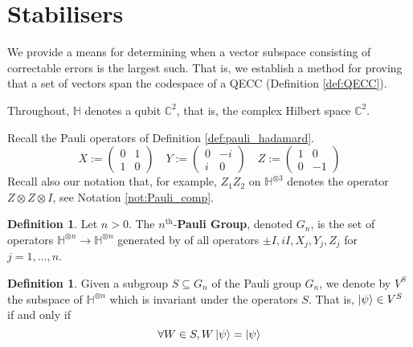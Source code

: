 \documentclass[12pt]{article}
\theoremstyle{plain}
\theoremstyle{definition}
\newtheorem{defn}[thm]{Definition} %
\newcommand{\bb}[1]{\mathbb{#1}}
\newcommand{\lto}{\longrightarrow}
\begin{document}
\section{Stabilisers}\label{sec:stabilisers}
	We provide a means for determining when a vector subspace consisting of correctable errors is the largest such. That is, we establish a method for proving that a set of vectors span the codespace of a QECC (Definition \ref{def:QECC}).
	
	Throughout, $\bb{H}$ denotes a qubit $\bb{C}^2$, that is, the complex Hilbert space $\bb{C}^2$.
	
	Recall the Pauli operators of Definition \ref{def:pauli_hadamard}.
	\begin{equation}
		X :=
		\begin{pmatrix}
			0 &1\\
			1 &0
		\end{pmatrix}
		\quad
		Y :=
		\begin{pmatrix}
			0 & -i\\
			i & 0
		\end{pmatrix}
	\quad
		Z :=
		\begin{pmatrix}
			1 & 0\\
			0 & -1
		\end{pmatrix}
	\end{equation}
	Recall also our notation that, for example, $Z_1Z_2$ on $\bb{H}^{\otimes 3}$ denotes the operator $Z \otimes Z \otimes I$, see Notation \ref{not:Pauli_comp}.
	
	\begin{defn}
		Let $n > 0$. The $n^{\text{th}}$-\textbf{Pauli Group}, denoted $G_n$, is the set of operators $\bb{H}^{\otimes n} \lto \bb{H}^{\otimes n}$ generated by of all operators $\pm I,  i I, X_j, Y_j, Z_j$ for $j = 1,...,n$.
	\end{defn}
\begin{defn}
Given a subgroup $S \subseteq G_n$ of the Pauli group $G_n$, we denote by $V^S$ the subspace of $\bb{H}^{\otimes n}$ which is invariant under the operators $S$. That is, $\ket{\psi} \in V^S$ if and only if
	\begin{equation}
		\forall W \in S, W\ket{\psi} = \ket{\psi}
	\end{equation}
\end{defn}
\end{document}
